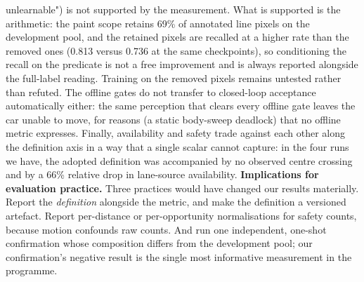 \documentclass[journal]{IEEEtran}
\begin{document}
unlearnable") is not supported by the measurement. What is supported is the arithmetic: the paint scope
retains 69\% of annotated line pixels on the development pool, and the retained pixels are recalled at a
higher rate than the removed ones (0.813 versus 0.736 at the same checkpoints), so conditioning the recall on
the predicate is not a free improvement and is always reported alongside the full-label reading. Training on
the removed pixels remains untested rather than refuted.
The offline gates do not transfer to closed-loop acceptance automatically either: the same perception that
clears every offline gate leaves the car unable to move, for reasons (a static body-sweep deadlock) that no
offline metric expresses. Finally, availability and safety trade against each other along the definition
axis in a way that a single scalar cannot capture: in the four runs we have, the adopted definition was
accompanied by no observed centre crossing and by a 66\% relative drop in lane-source availability.
\textbf{Implications for evaluation practice.} Three practices would have changed our results materially.
Report the \emph{definition} alongside the metric, and make the definition a versioned artefact. Report
per-distance or per-opportunity normalisations for safety counts, because motion confounds raw
counts. And run one independent, one-shot confirmation whose composition differs from the
development pool; our confirmation's negative result is the single most informative measurement in
the programme.
\end{document}
